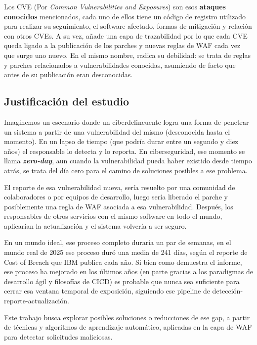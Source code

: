 \documentclass[12pt]{article}
\begin{document}
Los CVE (Por \textit{Common Vulnerabilities and Exposures}) son esos \textbf{ataques conocidos} mencionados, cada uno de ellos tiene un código de registro utilizado para realizar su seguimiento, el software afectado, formas de mitigación y relación con otros CVEs. A su vez, añade una capa de trazabilidad por lo que cada CVE queda ligado a la publicación de los parches y nuevas reglas de WAF cada vez que surge uno nuevo. En el mismo nombre, radica su debilidad: se trata de reglas y parches relacionados a vulnerabilidades conocidas, asumiendo de facto que antes de su publicación eran desconocidas.


\subsection{Justificación del estudio}
\label{sec:justificacion-estudio}
Imaginemos un escenario donde un ciberdelincuente logra una forma de penetrar un sistema a partir de una vulnerabilidad del mismo (desconocida hasta el momento). En un lapso de tiempo (que podría durar entre un segundo y diez años) el responsable lo detecta y lo reporta. En ciberseguridad, ese momento se llama \textbf{\textit{zero-day}}, aun cuando la vulnerabilidad pueda haber existido desde tiempo atrás, se trata del día cero para el camino de soluciones posibles a ese problema.

El reporte de esa vulnerabilidad nueva, sería resuelto por una comunidad de colaboradores o por equipos de desarrollo, luego sería liberado el parche y posiblemente una regla de WAF asociada a esa vulnerabilidad. Después, los responsables de otros servicios con el mismo software en todo el mundo, aplicarían la actualización y el sistema volvería a ser seguro.

En un mundo ideal, ese proceso completo duraría un par de semanas, en el mundo real de 2025 ese proceso duró una media de 241 días, según el reporte de Cost of Breach que IBM publica cada año\cite{ibm_databreach_2025}. Si bien como demuestra el informe, ese proceso ha mejorado en los últimos años (en parte gracias a los paradigmas de desarrollo ágil y filosofías de CICD) es probable que nunca sea suficiente para cerrar esa ventana temporal de exposición, siguiendo ese pipeline de detección-reporte-actualización.

Este trabajo busca explorar posibles soluciones o reducciones de ese gap, a partir de técnicas y algoritmos de aprendizaje automático, aplicadas en la capa de WAF para detectar solicitudes maliciosas.
\end{document}
